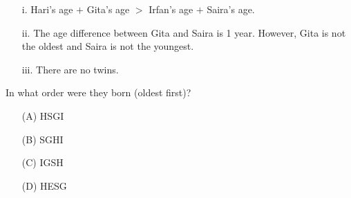 \documentclass[journal]{IEEEtran}
\begin{document}
\begin{enumerate}
\begin{itemize}
    \item[i.] Hari's age \( + \) Gita's age \( > \) Irfan's age \( + \) Saira's age.
    \item[ii.] The age difference between Gita and Saira is 1 year. However, Gita is not the oldest and Saira is not the youngest.
    \item[iii.] There are no twins.
\end{itemize}

In what order were they born (oldest first)?

\begin{itemize}
    \item[(A)] HSGI
    \item[(B)] SGHI
    \item[(C)] IGSH
    \item[(D)] HESG
\end{itemize}
\end{enumerate}
\end{document}
